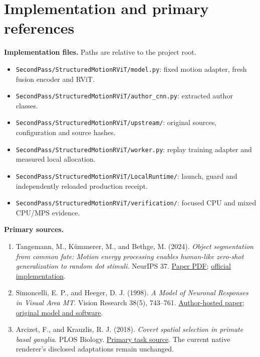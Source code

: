 \documentclass[11pt]{article}
\newcommand{\code}[1]{\nolinkurl{#1}}
\begin{document}
\section{Implementation and primary references}\label{sec:references}

\textbf{Implementation files.} Paths are relative to the project root.
\begin{itemize}
\item \code{SecondPass/StructuredMotionRViT/model.py}: fixed motion adapter, fresh fusion encoder and RViT.
\item \code{SecondPass/StructuredMotionRViT/author_cnn.py}: extracted author classes.
\item \code{SecondPass/StructuredMotionRViT/upstream/}: original sources, configuration and source hashes.
\item \code{SecondPass/StructuredMotionRViT/worker.py}: replay training adapter and measured local allocation.
\item \code{SecondPass/StructuredMotionRViT/LocalRuntime/}: launch, guard and independently reloaded production receipt.
\item \code{SecondPass/StructuredMotionRViT/verification/}: focused CPU and mixed CPU/MPS evidence.
\end{itemize}

\textbf{Primary sources.}
\begin{enumerate}
\item Tangemann, M., K\"ummerer, M., and Bethge, M. (2024). \emph{Object segmentation from common fate: Motion energy processing enables human-like zero-shot generalization to random dot stimuli}. NeurIPS 37. \href{https://papers.nips.cc/paper_files/paper/2024/file/f7d3cef7ff579f2f903c8f458e730cae-Paper-Conference.pdf}{Paper PDF}; \href{https://github.com/mtangemann/motion_energy_segmentation}{official implementation}.
\item Simoncelli, E. P., and Heeger, D. J. (1998). \emph{A Model of Neuronal Responses in Visual Area MT}. Vision Research 38(5), 743--761. \href{https://www.cns.nyu.edu/pub/eero/simoncelli96-reprint.pdf}{Author-hosted paper}; \href{https://www.cns.nyu.edu/~lcv/MTmodel/}{original model and software}.
\item Arcizet, F., and Krauzlis, R. J. (2018). \emph{Covert spatial selection in primate basal ganglia}. PLOS Biology. \href{https://doi.org/10.1371/journal.pbio.2005930}{Primary task source}. The current native renderer's disclosed adaptations remain unchanged.
\end{enumerate}
\end{document}
